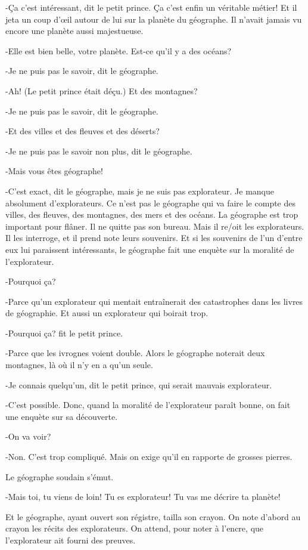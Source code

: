 \documentclass{report}
\begin{document}
-Ça c'est intéressant, dit le petit prince. Ça c'est enfin un véritable métier! Et il jeta un coup d'œil autour de lui sur la planète du géographe. Il n'avait jamais vu encore une planète aussi majestueuse.

-Elle est bien belle, votre planète. Est-ce qu'il y a des océans?

-Je ne puis pas le savoir, dit le géographe.

-Ah! (Le petit prince était déçu.) Et des montagnes?

-Je ne puis pas le savoir, dit le géographe.

-Et des villes et des fleuves et des déserts?

-Je ne puis pas le savoir non plus, dit le géographe.

-Mais vous êtes géographe!

-C'est exact, dit le géographe, mais je ne suis pas explorateur. Je manque absolument d'explorateurs. Ce n'est pas le géographe qui va faire le compte des villes, des fleuves, des montagnes, des mers et des océans. La géographe est trop important pour flâner. Il ne quitte pas son bureau. Mais il re/oit les explorateurs. Il les interroge, et il prend note leurs souvenirs. Et si les souvenirs de l'un d'entre eux lui paraissent intéressants, le géographe fait une enquète sur la moralité de l'explorateur.

-Pourquoi ça?

-Parce qu'un explorateur qui mentait entraînerait des catastrophes dans les livres de géographie. Et aussi un explorateur qui boirait trop.

-Pourquoi ça? fit le petit prince.

-Parce que les ivrognes voient double. Alors le géographe noterait deux montagnes, là où il n'y en a qu'un seule.

-Je connais quelqu'un, dit le petit prince, qui serait mauvais explorateur.

-C'est possible. Donc, quand la moralité de l'explorateur paraît bonne, on fait une enquète sur sa découverte.

-On va voir?

-Non. C'est trop compliqué. Mais on exige qu'il en rapporte de grosses pierres.

Le géographe soudain s'émut.

-Mais toi, tu viens de loin! Tu es explorateur! Tu vas me décrire ta planète!

Et le géographe, ayant ouvert son régistre, tailla son crayon. On note d'abord au crayon les récits des explorateurs. On attend, pour noter à l'encre, que l'explorateur ait fourni des preuves.
\end{document}
